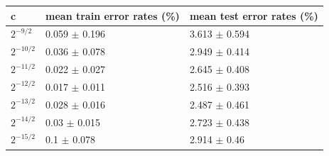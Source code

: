 \begin{tabular}{lll}
\toprule
c & mean train error rates (\%) & mean test error rates (\%) \\
\midrule
$2^{-9/2}$ & 0.059 $\pm$ 0.196 & 3.613 $\pm$ 0.594 \\
$2^{-10/2}$ & 0.036 $\pm$ 0.078 & 2.949 $\pm$ 0.414 \\
$2^{-11/2}$ & 0.022 $\pm$ 0.027 & 2.645 $\pm$ 0.408 \\
$2^{-12/2}$ & 0.017 $\pm$ 0.011 & 2.516 $\pm$ 0.393 \\
$2^{-13/2}$ & 0.028 $\pm$ 0.016 & 2.487 $\pm$ 0.461 \\
$2^{-14/2}$ & 0.03 $\pm$ 0.015 & 2.723 $\pm$ 0.438 \\
$2^{-15/2}$ & 0.1 $\pm$ 0.078 & 2.914 $\pm$ 0.46 \\
\bottomrule
\end{tabular}
